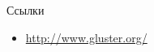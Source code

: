 \documentclass{beamer}
\begin{document}
\begin{frame}{Ссылки}
	\begin{itemize}
		\item \url{http://www.gluster.org/}
	\end{itemize}
\end{frame}
\end{document}
